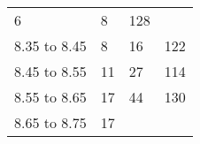 \documentclass[]{article}
\begin{document}
\begin{longtable}[]{@{}llll@{}}
\begin{minipage}[t]{0.22\columnwidth}
6\strut
\end{minipage} & \begin{minipage}[t]{0.22\columnwidth}\raggedright
8\strut
\end{minipage} & \begin{minipage}[t]{0.22\columnwidth}\raggedright
128\strut
\end{minipage}\tabularnewline
\begin{minipage}[t]{0.22\columnwidth}\raggedright
8.35 to 8.45\strut
\end{minipage} & \begin{minipage}[t]{0.22\columnwidth}\raggedright
8\strut
\end{minipage} & \begin{minipage}[t]{0.22\columnwidth}\raggedright
16\strut
\end{minipage} & \begin{minipage}[t]{0.22\columnwidth}\raggedright
122\strut
\end{minipage}\tabularnewline
\begin{minipage}[t]{0.22\columnwidth}\raggedright
8.45 to 8.55\strut
\end{minipage} & \begin{minipage}[t]{0.22\columnwidth}\raggedright
11\strut
\end{minipage} & \begin{minipage}[t]{0.22\columnwidth}\raggedright
27\strut
\end{minipage} & \begin{minipage}[t]{0.22\columnwidth}\raggedright
114\strut
\end{minipage}\tabularnewline
\begin{minipage}[t]{0.22\columnwidth}\raggedright
8.55 to 8.65\strut
\end{minipage} & \begin{minipage}[t]{0.22\columnwidth}\raggedright
17\strut
\end{minipage} & \begin{minipage}[t]{0.22\columnwidth}\raggedright
44\strut
\end{minipage} & \begin{minipage}[t]{0.22\columnwidth}\raggedright
130\strut
\end{minipage}\tabularnewline
\begin{minipage}[t]{0.22\columnwidth}\raggedright
8.65 to 8.75\strut
\end{minipage} & \begin{minipage}[t]{0.22\columnwidth}\raggedright
17\strut
\end{minipage} & \begin{minipage}[t]{0.22\columnwidth}\raggedright

\end{minipage}
\end{longtable}
\end{document}
